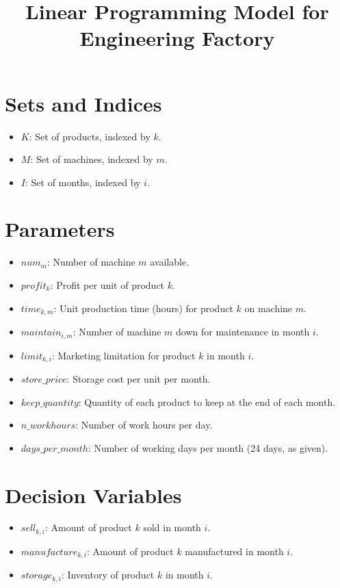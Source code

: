 \documentclass{article}
\begin{document}
\title{Linear Programming Model for Engineering Factory}
\author{}
\date{}
\maketitle

\section*{Sets and Indices}
\begin{itemize}
    \item $K$: Set of products, indexed by $k$.
    \item $M$: Set of machines, indexed by $m$.
    \item $I$: Set of months, indexed by $i$.
\end{itemize}

\section*{Parameters}
\begin{itemize}
    \item $num_{m}$: Number of machine $m$ available.
    \item $profit_{k}$: Profit per unit of product $k$.
    \item $time_{k, m}$: Unit production time (hours) for product $k$ on machine $m$.
    \item $maintain_{i, m}$: Number of machine $m$ down for maintenance in month $i$.
    \item $limit_{k, i}$: Marketing limitation for product $k$ in month $i$.
    \item $store\_price$: Storage cost per unit per month.
    \item $keep\_quantity$: Quantity of each product to keep at the end of each month.
    \item $n\_workhours$: Number of work hours per day.
    \item $days\_per\_month$: Number of working days per month (24 days, as given).
\end{itemize}

\section*{Decision Variables}
\begin{itemize}
    \item $sell_{k, i}$: Amount of product $k$ sold in month $i$.
    \item $manufacture_{k, i}$: Amount of product $k$ manufactured in month $i$.
    \item $storage_{k, i}$: Inventory of product $k$ in month $i$.
\end{itemize}
\end{document}
